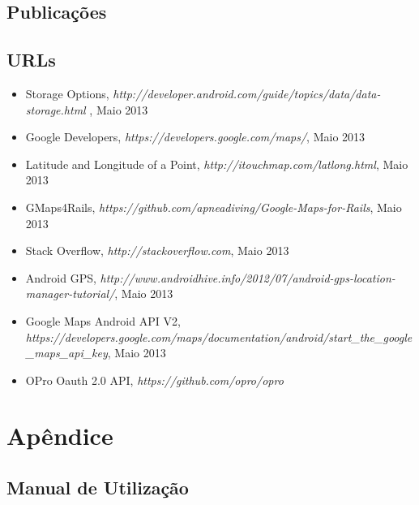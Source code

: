 \documentclass[15pt,a4paper]{article}
\begin{document}
\subsection{Publicações}

\subsection{URLs}

\begin{itemize}
\item Storage Options, \emph{http://developer.android.com/guide/topics/data/data-storage.html
}, Maio 2013
\item Google Developers, \emph{https://developers.google.com/maps/}, Maio 2013

\item Latitude and Longitude of a Point, \emph{http://itouchmap.com/latlong.html}, Maio 2013
\item GMaps4Rails, \emph{https://github.com/apneadiving/Google-Maps-for-Rails}, Maio 2013

\item Stack Overflow, \emph{http://stackoverflow.com}, Maio 2013

\item Android GPS, \emph{http://www.androidhive.info/2012/07/android-gps-location-manager-tutorial/}, Maio 2013

\item Google Maps Android API V2, \emph{https://developers.google.com/maps/documentation/android/start\_the\_google\_maps\_api\_key}, Maio 2013

\item OPro Oauth 2.0 API, \emph{https://github.com/opro/opro}

\end{itemize}



\newpage
\appendix
\section{Apêndice}
\subsection{Manual de Utilização}
\end{document}
